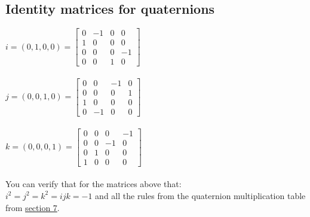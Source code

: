 \documentclass{article}
\begin{document}
\subsection{Identity matrices for quaternions}
$i = (0,1,0,0)=\begin{bmatrix}
0 & -1 & 0 & 0\\
1 & 0 & 0 & 0\\
0 & 0 & 0 & -1\\
0 & 0 & 1 & 0
\end{bmatrix}$\\\\
$j = (0,0,1,0)=\begin{bmatrix}
0 & 0 & -1 & 0\\
0 & 0 & 0 & 1\\
1 & 0 & 0 & 0\\
0 & -1 & 0 & 0
\end{bmatrix}$\\\\
$k = (0,0,0,1)=\begin{bmatrix}
0 & 0 & 0 & -1\\
0 & 0 & -1 & 0\\
0 & 1 & 0 & 0\\
1 & 0 & 0 & 0
\end{bmatrix}$\\\\
You can verify that for the matrices above that:\\
$i^2 = j^2= k^2 = ijk =-1$ and all the rules from the quaternion multiplication table from \hyperref[sec:Q]{section 7}.
\end{document}
